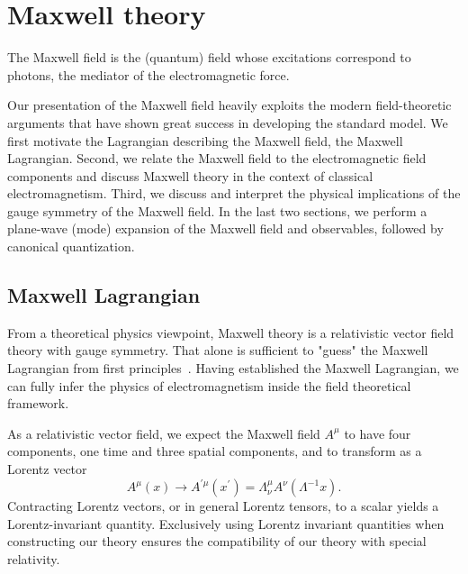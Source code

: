 \section{Maxwell theory}

The Maxwell field is the (quantum) field whose excitations correspond to photons, the mediator of the electromagnetic force.

Our presentation of the Maxwell field heavily exploits the modern field-theoretic arguments that have shown great success in developing the standard model.
We first motivate the Lagrangian describing the Maxwell field, the Maxwell Lagrangian.
Second, we relate the Maxwell field to the electromagnetic field components and discuss Maxwell theory in the context of classical electromagnetism.
Third, we discuss and interpret the physical implications of the gauge symmetry of the Maxwell field.
In the last two sections, we perform a plane-wave (mode) expansion of the Maxwell field and observables, followed by canonical quantization.

\subsection{Maxwell Lagrangian}

From a theoretical physics viewpoint, Maxwell theory is a relativistic vector field theory with gauge symmetry.
That alone is sufficient to "guess" the Maxwell Lagrangian from first principles~\cite[p.~149]{Greiner2013}.
Having established the Maxwell Lagrangian, we can fully infer the physics of electromagnetism inside the field theoretical framework.

As a relativistic vector field, we expect the Maxwell field $A^\mu$ to have four components, one time and three spatial components, and to transform as a Lorentz vector~\cite[p.~37]{Peskin1995}
\begin{equation}
	A^\mu(x)
	\to
	A^{\prime\mu}(x^\prime)
	=
	\Lambda^\mu_\nu
	A^\nu(\Lambda^{-1}x)
	.
\end{equation}
Contracting Lorentz vectors, or in general Lorentz tensors, to a scalar yields a Lorentz-invariant quantity.
Exclusively using Lorentz invariant quantities when constructing our theory ensures the compatibility of our theory with special relativity.

